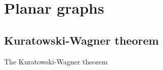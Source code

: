 \documentclass{article}
\author{Eric Luu}
\begin{document}
\section{Planar graphs}

\subsection{Kuratowski-Wagner theorem}
The Kuratowski-Wagner theorem 
\end{document}
